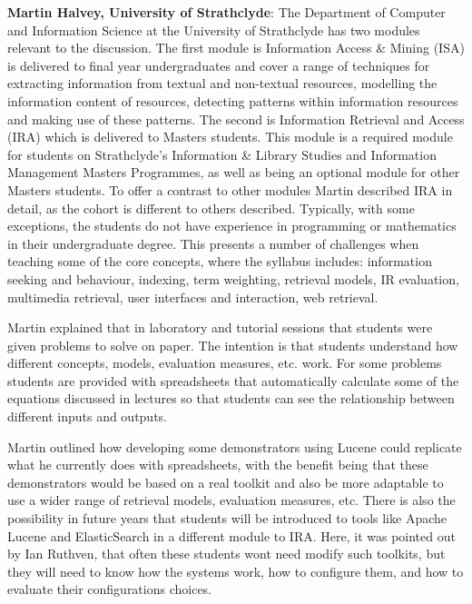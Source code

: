 {\bf Martin Halvey, University of Strathclyde}: The Department of Computer and Information Science at the University of Strathclyde has two modules relevant to the discussion. The first module is Information Access \& Mining (ISA) is delivered to final year undergraduates and cover a range of techniques for extracting information from textual and non-textual resources, modelling the information content of resources, detecting patterns within information resources and making use of these patterns. The second is Information Retrieval and Access (IRA) which is delivered to Masters students. This module is a required module for students on Strathclyde's Information \& Library Studies and Information Management Masters Programmes, as well as being an optional module for other Masters students. To offer a contrast to other modules Martin described IRA in detail, as the cohort is different to others described. Typically, with some exceptions, the students do not have experience in programming or mathematics in their undergraduate degree. This presents a number of challenges when teaching some of the core concepts, where the syllabus includes:
information seeking and behaviour,
indexing,
term weighting,
retrieval models,
IR evaluation,
multimedia retrieval,
user interfaces and interaction,
web retrieval. 

Martin explained that in laboratory and tutorial sessions that students were given problems to solve on paper. The intention is that students understand how different concepts, models, evaluation measures, etc. work. For some problems students are provided with spreadsheets that automatically calculate some of the equations discussed in lectures so that students can see the relationship between different inputs and outputs. 

Martin outlined how developing some demonstrators using Lucene could replicate what he currently does with spreadsheets, with the benefit being that these demonstrators would be based on a real toolkit and also be more adaptable to use a wider range of retrieval models, evaluation measures, etc. There is also the possibility in future years that students will be introduced to tools like Apache Lucene and ElasticSearch in a different module to IRA. Here, it was pointed out by Ian Ruthven, that often these students wont need modify such toolkits, but they will need to know how the systems work, how to configure them, and how to evaluate their configurations choices.\\

